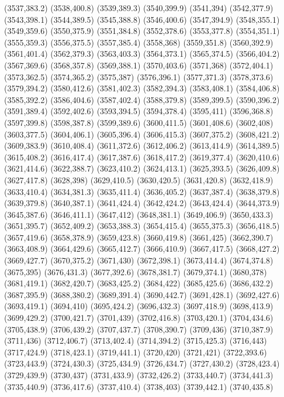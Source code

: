 (3537,383.2)
(3538,400.8)
(3539,389.3)
(3540,399.9)
(3541,394)
(3542,377.9)
(3543,398.1)
(3544,389.5)
(3545,388.8)
(3546,400.6)
(3547,394.9)
(3548,355.1)
(3549,359.6)
(3550,375.9)
(3551,384.8)
(3552,378.6)
(3553,377.8)
(3554,351.1)
(3555,359.3)
(3556,375.5)
(3557,385.4)
(3558,368)
(3559,351.8)
(3560,392.9)
(3561,401.4)
(3562,379.3)
(3563,403.3)
(3564,373.1)
(3565,374.5)
(3566,404.2)
(3567,369.6)
(3568,357.8)
(3569,388.1)
(3570,403.6)
(3571,368)
(3572,404.1)
(3573,362.5)
(3574,365.2)
(3575,387)
(3576,396.1)
(3577,371.3)
(3578,373.6)
(3579,394.2)
(3580,412.6)
(3581,402.3)
(3582,394.3)
(3583,408.1)
(3584,406.8)
(3585,392.2)
(3586,404.6)
(3587,402.4)
(3588,379.8)
(3589,399.5)
(3590,396.2)
(3591,389.4)
(3592,402.6)
(3593,394.5)
(3594,378.4)
(3595,411)
(3596,368.8)
(3597,399.8)
(3598,387.8)
(3599,389.6)
(3600,411.5)
(3601,408.6)
(3602,408)
(3603,377.5)
(3604,406.1)
(3605,396.4)
(3606,415.3)
(3607,375.2)
(3608,421.2)
(3609,383.9)
(3610,408.4)
(3611,372.6)
(3612,406.2)
(3613,414.9)
(3614,389.5)
(3615,408.2)
(3616,417.4)
(3617,387.6)
(3618,417.2)
(3619,377.4)
(3620,410.6)
(3621,414.6)
(3622,388.7)
(3623,410.2)
(3624,413.1)
(3625,393.5)
(3626,409.8)
(3627,417.8)
(3628,398)
(3629,410.5)
(3630,420.5)
(3631,420.8)
(3632,418.9)
(3633,410.4)
(3634,381.3)
(3635,411.4)
(3636,405.2)
(3637,387.4)
(3638,379.8)
(3639,379.8)
(3640,387.1)
(3641,424.4)
(3642,424.2)
(3643,424.4)
(3644,373.9)
(3645,387.6)
(3646,411.1)
(3647,412)
(3648,381.1)
(3649,406.9)
(3650,433.3)
(3651,395.7)
(3652,409.2)
(3653,388.3)
(3654,415.4)
(3655,375.3)
(3656,418.5)
(3657,419.6)
(3658,378.9)
(3659,423.8)
(3660,419.8)
(3661,425)
(3662,390.7)
(3663,408.9)
(3664,429.6)
(3665,412.7)
(3666,410.9)
(3667,417.5)
(3668,427.2)
(3669,427.7)
(3670,375.2)
(3671,430)
(3672,398.1)
(3673,414.4)
(3674,374.8)
(3675,395)
(3676,431.3)
(3677,392.6)
(3678,381.7)
(3679,374.1)
(3680,378)
(3681,419.1)
(3682,420.7)
(3683,425.2)
(3684,422)
(3685,425.6)
(3686,432.2)
(3687,395.9)
(3688,380.2)
(3689,391.4)
(3690,442.7)
(3691,428.1)
(3692,427.6)
(3693,419.1)
(3694,410)
(3695,424.2)
(3696,432.3)
(3697,418.9)
(3698,413.9)
(3699,429.2)
(3700,421.7)
(3701,439)
(3702,416.8)
(3703,420.1)
(3704,434.6)
(3705,438.9)
(3706,439.2)
(3707,437.7)
(3708,390.7)
(3709,436)
(3710,387.9)
(3711,436)
(3712,406.7)
(3713,402.4)
(3714,394.2)
(3715,425.3)
(3716,443)
(3717,424.9)
(3718,423.1)
(3719,441.1)
(3720,420)
(3721,421)
(3722,393.6)
(3723,443.9)
(3724,430.3)
(3725,434.9)
(3726,434.7)
(3727,430.2)
(3728,423.4)
(3729,439.9)
(3730,437)
(3731,433.9)
(3732,426.2)
(3733,440.7)
(3734,441.3)
(3735,440.9)
(3736,417.6)
(3737,410.4)
(3738,403)
(3739,442.1)
(3740,435.8)
